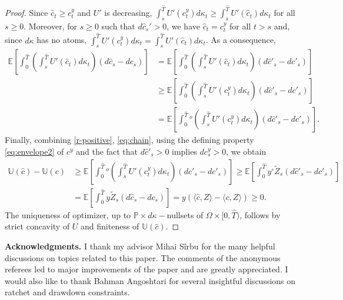 \documentclass[11pt, oneside]{article}   	%
\theoremstyle{plain}
\theoremstyle{definition}
\theoremstyle{remark}
\begin{document}
\begin{appendix}
\begin{proof}
Since $\hat{c}_t\geq c^y_t$ and $U'$ is decreasing, $\int_s^{\hat{T}} U'(c^y_t)d\kappa_t\geq \int_s^{\hat{T}} U'(\hat{c}_t)d\kappa_t$ for all $s\geq 0$. Moreover, for $s\geq 0$ such that $d\hat{c}_s'>0$, we have $\hat{c}_t=c^y_t$ for all $t>s$ and, since $d\kappa$ has no atoms, $\int_s^{\hat{T}} U'(c^y_t)d\kappa_t= \int_s^{\hat{T}} U'(\hat{c}_t)d\kappa_t$. As a consequence,\begin{equation}\label{eq:chain}
\begin{aligned}
\mathbb{E}\left[\int_0^{\hat{T}} \left(\int_s^{\hat{T}} U'(\hat{c}_t)d\kappa_t\right)(d\hat{c}_s-dc_s)\right]&=\mathbb{E}\left[\int_0^{\hat{T}} \left(\int_s^{\hat{T}} U'(\hat{c}_t)d\kappa_t\right)(d\hat{c}'_s-dc'_s)\right]\\
&\geq\mathbb{E}\left[\int_0^{\hat{T}} \left(\int_s^{\hat{T}} U'(c^y_t)d\kappa_t\right)(d\hat{c}'_s-dc'_s)\right]\\
&=\mathbb{E}\left[\int_0^{\hat{T}} {}^o\left(\int_s^{\hat{T}} U'(c^y_t)d\kappa_t\right)(d\hat{c}'_s-dc'_s)\right].
\end{aligned}
\end{equation}
Finally, combining \eqref{r-positive}, \eqref{eq:chain}, using the defining property \eqref{eq:envelope2} of $c^y$ and the fact that $d\hat{c}'_s>0$ implies $dc^y_s>0$, we obtain
\begin{equation*}
\begin{aligned}
\mathbb{U}(\hat{c})-\mathbb{U}(c)&\geq \mathbb{E}\left[\int_0^{\hat{T}} {}^o\left(\int_s^{\hat{T}} U'(c^y_t)d\kappa_t\right)(d\hat{c}'_s-dc'_s)\right]\geq \mathbb{E}\left[\int_0^{\hat{T}} y^\circ\tilde{Z}_s(d\hat{c}'_s-dc'_s)\right]\\
&=\mathbb{E}\left[\int_0^{\hat{T}} y\tilde{Z}_s(d\hat{c}_s-dc_s)\right]=y\left(\langle\hat{c},Z\rangle-\langle c,Z\rangle\right)\geq 0.
\end{aligned}
\end{equation*}
The uniqueness of optimizer, up to $\mathbb{P}\times d\kappa-$nullsets of $\Omega\times[0,\hat{T})$, follows by strict concavity of $U$ and finiteness of $\mathbb{U}(\hat{c})$.
\end{proof}


\end{appendix}





\textbf{Acknowledgments.} I thank my advisor Mihai S\^irbu for the many helpful discussions on topics related to this paper. The comments of the anonymous referees led to major improvements of the paper and are greatly appreciated. I would also like to thank Bahman Angoshtari for several insightful discussions on ratchet and drawdown constraints.
\end{document}
